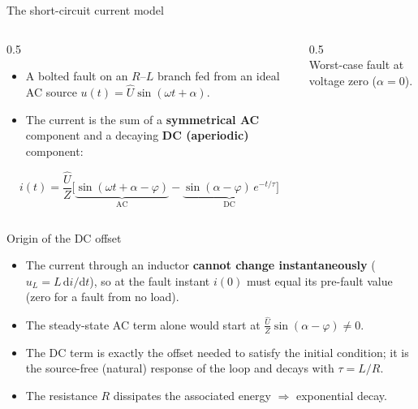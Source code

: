 \begin{frame}{The short-circuit current model}
  \begin{columns}[T,onlytextwidth]
    \begin{column}{0.5\textwidth}
      \begin{itemize}
        \setlength{\itemsep}{0.5em}
        \item A bolted fault on an $R$--$L$ branch fed from an ideal AC source
              $u(t)=\hat{U}\sin(\omega t+\alpha)$.
        \item The current is the sum of a \textbf{symmetrical AC} component and a
              decaying \textbf{DC (aperiodic)} component:
      \end{itemize}
      \vspace{0.6em}
      \[ i(t)=\frac{\hat U}{Z}\Big[\underbrace{\sin(\omega t+\alpha-\varphi)}_{\text{AC}}
              -\underbrace{\sin(\alpha-\varphi)\,e^{-t/\tau}}_{\text{DC}}\Big] \]
    \end{column}
    \begin{column}{0.5\textwidth}\centering
      \\[0.2em]
      {\color{atGray}\footnotesize Worst-case fault at voltage zero ($\alpha=0$).}
    \end{column}
  \end{columns}
\end{frame}


\begin{frame}{Origin of the DC offset}
  \begin{itemize}
    \setlength{\itemsep}{0.6em}
    \item The current through an inductor \textbf{cannot change instantaneously}
          ($u_L=L\,\mathrm{d}i/\mathrm{d}t$), so at the fault instant $i(0)$ must
          equal its pre-fault value (zero for a fault from no load).
    \item The steady-state AC term alone would start at $\tfrac{\hat U}{Z}\sin(\alpha-\varphi)\neq 0$.
    \item The DC term is exactly the offset needed to satisfy the initial condition;
          it is the source-free (natural) response of the loop and decays with $\tau=L/R$.
    \item The resistance $R$ dissipates the associated energy $\Rightarrow$ exponential decay.
  \end{itemize}
\end{frame}



